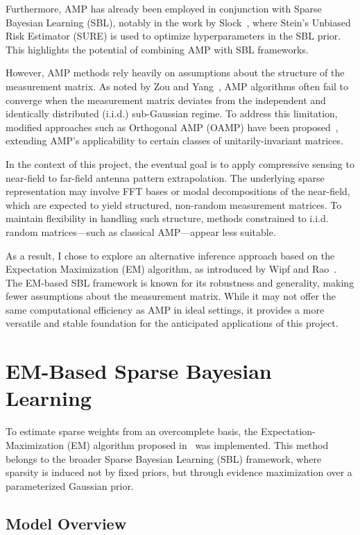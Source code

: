 \documentclass{article}
\begin{document}
Furthermore, AMP has already been employed in conjunction with Sparse Bayesian Learning (SBL), notably in the work by Slock~\cite{slockSURE}, where Stein’s Unbiased Risk Estimator (SURE) is used to optimize hyperparameters in the SBL prior. This highlights the potential of combining AMP with SBL frameworks.

However, AMP methods rely heavily on assumptions about the structure of the measurement matrix. As noted by Zou and Yang~\cite{zou2022concise}, AMP algorithms often fail to converge when the measurement matrix deviates from the independent and identically distributed (i.i.d.) sub-Gaussian regime. To address this limitation, modified approaches such as Orthogonal AMP (OAMP) have been proposed~\cite{zou2022concise}, extending AMP's applicability to certain classes of unitarily-invariant matrices.

In the context of this project, the eventual goal is to apply compressive sensing to near-field to far-field antenna pattern extrapolation. The underlying sparse representation may involve FFT bases or modal decompositions of the near-field, which are expected to yield structured, non-random measurement matrices. To maintain flexibility in handling such structure, methods constrained to i.i.d. random matrices—such as classical AMP—appear less suitable.

As a result, I chose to explore an alternative inference approach based on the Expectation Maximization (EM) algorithm, as introduced by Wipf and Rao~\cite{wipf2004sparse}. The EM-based SBL framework is known for its robustness and generality, making fewer assumptions about the measurement matrix. While it may not offer the same computational efficiency as AMP in ideal settings, it provides a more versatile and stable foundation for the anticipated applications of this project.

\section{EM-Based Sparse Bayesian Learning}

To estimate sparse weights from an overcomplete basis, the Expectation-Maximization (EM) algorithm proposed in~\cite{wipf2004sparse} was implemented. This method belongs to the broader Sparse Bayesian Learning (SBL) framework, where sparsity is induced not by fixed priors, but through evidence maximization over a parameterized Gaussian prior.

\subsection{Model Overview}
\end{document}

